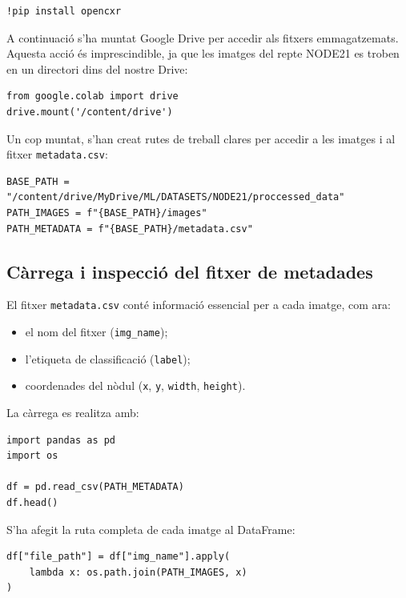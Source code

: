 \documentclass[12pt,a4paper]{article}
\begin{document}
\begin{lstlisting}[style=mypython]
!pip install opencxr
\end{lstlisting}

A continuació s’ha muntat Google Drive per accedir als fitxers emmagatzemats. Aquesta acció és imprescindible, ja que les imatges del repte NODE21 es troben en un directori dins del nostre Drive:

\begin{lstlisting}[style=mypython]
from google.colab import drive
drive.mount('/content/drive')
\end{lstlisting}

Un cop muntat, s’han creat rutes de treball clares per accedir a les imatges i al fitxer \texttt{metadata.csv}:

\begin{lstlisting}[style=mypython]
BASE_PATH = "/content/drive/MyDrive/ML/DATASETS/NODE21/proccessed_data"
PATH_IMAGES = f"{BASE_PATH}/images"
PATH_METADATA = f"{BASE_PATH}/metadata.csv"
\end{lstlisting}

\subsection{Càrrega i inspecció del fitxer de metadades}

El fitxer \texttt{metadata.csv} conté informació essencial per a cada imatge, com ara:

\begin{itemize}
    \item el nom del fitxer (\texttt{img\_name});
    \item l’etiqueta de classificació (\texttt{label});
    \item coordenades del nòdul (\texttt{x}, \texttt{y}, \texttt{width}, \texttt{height}).
\end{itemize}

La càrrega es realitza amb:

\begin{lstlisting}[style=mypython]
import pandas as pd
import os

df = pd.read_csv(PATH_METADATA)
df.head()
\end{lstlisting}

S’ha afegit la ruta completa de cada imatge al DataFrame:

\begin{lstlisting}[style=mypython]
df["file_path"] = df["img_name"].apply(
    lambda x: os.path.join(PATH_IMAGES, x)
)
\end{lstlisting}
\end{document}
